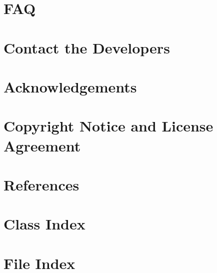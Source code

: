 \documentclass[twoside]{book}
\newcommand{\+}{\discretionary{\mbox{\scriptsize$\hookleftarrow$}}{}{}}
\begin{document}
\chapter{FAQ}
\label{FAQ}

\chapter{Contact the Developers}
\label{contact}

\chapter{Acknowledgements}
\label{acknowledgements}

\chapter{Copyright Notice and License Agreement}
\label{copyright}

\chapter{References}
\label{References}

\chapter{Class Index}

\chapter{File Index}

\end{document}

